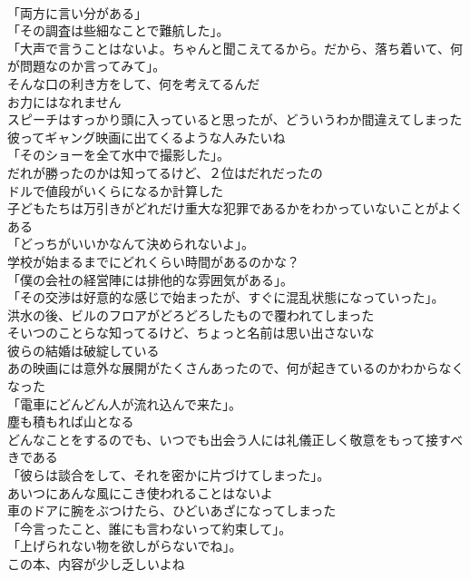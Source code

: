 \documentclass[8pt]{extreport}
\begin{document}
\begin{CJK}{UTF8}{min}
\\	「両方に言い分がある」	
\\	「その調査は些細なことで難航した」。	
\\	「大声で言うことはないよ。ちゃんと聞こえてるから。だから、落ち着いて、何が問題なのか言ってみて」。	
\\	そんな口の利き方をして、何を考えてるんだ	
\\	お力にはなれません	
\\	スピーチはすっかり頭に入っていると思ったが、どういうわか間違えてしまった	
\\	彼ってギャング映画に出てくるような人みたいね	
\\	「そのショーを全て水中で撮影した」。	
\\	だれが勝ったのかは知ってるけど、２位はだれだったの	
\\	ドルで値段がいくらになるか計算した	
\\	子どもたちは万引きがどれだけ重大な犯罪であるかをわかっていないことがよくある	
\\	「どっちがいいかなんて決められないよ」。	
\\	学校が始まるまでにどれくらい時間があるのかな？	
\\	「僕の会社の経営陣には排他的な雰囲気がある」。	
\\	「その交渉は好意的な感じで始まったが、すぐに混乱状態になっていった」。	
\\	洪水の後、ビルのフロアがどろどろしたもので覆われてしまった	
\\	そいつのことらな知ってるけど、ちょっと名前は思い出さないな	
\\	彼らの結婚は破綻している	
\\	あの映画には意外な展開がたくさんあったので、何が起きているのかわからなくなった	
\\	「電車にどんどん人が流れ込んで来た」。	
\\	塵も積もれば山となる	
\\	どんなことをするのでも、いつでも出会う人には礼儀正しく敬意をもって接すべきである	
\\	「彼らは談合をして、それを密かに片づけてしまった」。	
\\	あいつにあんな風にこき使われることはないよ	
\\	車のドアに腕をぶつけたら、ひどいあざになってしまった	
\\	「今言ったこと、誰にも言わないって約束して」。	
\\	「上げられない物を欲しがらないでね」。	
\\	この本、内容が少し乏しいよね	

\end{CJK}
\end{document}
